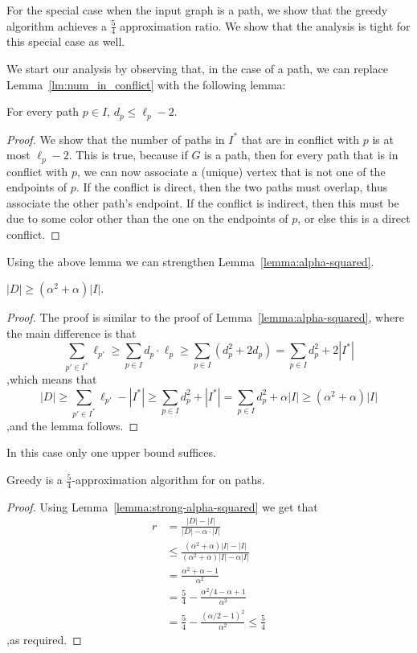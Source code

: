 

For the special case when the input graph is a path, 
we show that the greedy algorithm achieves a $\frac{5}{4}$ approximation ratio.
We show that the analysis is tight for this special case as well.

We start our analysis  by observing that, in the case of a path, we can replace
Lemma~\ref{lm:num_in_conflict} with the following lemma:

\begin{lemma}
For every path $p \in I$, $d_p \leq \ell_p - 2$.
\end{lemma}
\begin{proof}
We show that the number of paths in $I^*$ that
are in conflict with $p$ is at most $\ell_p - 2$.  
This is true, because if $G$ is a  path, 
then for every path that is in conflict with $p$, 
we can now associate a (unique) vertex that is not one of the endpoints of $p$.  
If the conflict is direct, then the two paths
must overlap, thus associate the other path's endpoint.  If the
conflict is indirect, then this must be due to some color other than
the one on the endpoints of $p$, or else this is a direct conflict.
{}\end{proof}

Using the above lemma we can strengthen
Lemma~\ref{lemma:alpha-squared}.

\begin{lemma}
\label{lemma:strong-alpha-squared}
$|D| \geq (\alpha^2+\alpha)|I|$.
\end{lemma}
\begin{proof}
The proof is similar to the proof of Lemma~\ref{lemma:alpha-squared},
where the main difference is that
\[
\sum_{p' \in I^*} \ell_{p'}
\geq \sum_{p \in I} d_p \cdot \ell_p
\geq \sum_{p \in I} (d_p^2 + 2d_p)
=    \sum_{p \in I} d_p^2 + 2|I^*|
\]
,which means that 
\[
|D| 
\geq \sum_{p' \in I^*} \ell_{p'} - |I^*|
\geq \sum_{p \in I} d_p^2 + |I^*|
=    \sum_{p \in I} d_p^2 + \alpha |I|
\geq (\alpha^2 + \alpha) |I|
\]
,and the lemma follows.
{}\end{proof}

In this case only one upper bound suffices.

\begin{theorem}
Greedy is a $\frac{5}{4}$-approximation algorithm for
\TWOCR{} on paths.
\end{theorem}
\begin{proof}
Using Lemma~\ref{lemma:strong-alpha-squared} we get that
\begin{align*}
r	& =    
\frac{|D| - |I|}{|D| - \alpha \cdot |I|}
\\&
\leq 
\frac{
	(\alpha^2 + \alpha)|I| - |I|
}{
	(\alpha^2 + \alpha)|I| - \alpha |I|
}
\\&
=    \frac{\alpha^2 + \alpha - 1}{\alpha^2}
\\&
=    \frac{5}{4} - \frac{\alpha^2/4 - \alpha + 1}{\alpha^2}
\\&
=    \frac{5}{4} - \frac{(\alpha/2-1)^2}{\alpha^2}
\leq \frac{5}{4}
\end{align*}
,as required.
{}\end{proof}

